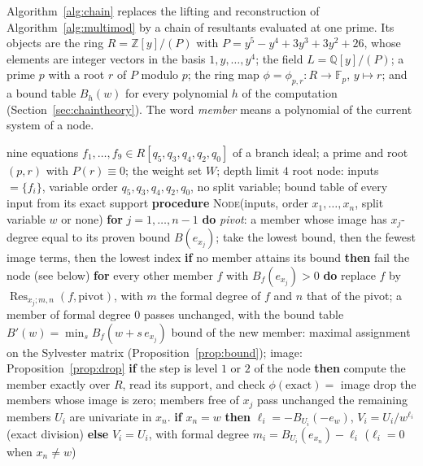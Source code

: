 \documentclass[11pt]{article}
\theoremstyle{remark}
\newcommand{\Q}{\mathbb{Q}}
\begin{document}
Algorithm~\ref{alg:chain} replaces the lifting and reconstruction of Algorithm~\ref{alg:multimod} by a chain of resultants evaluated at one prime. Its
objects are the ring $R=\mathbb Z[y]/(P)$ with $P=y^5-y^4+3y^3+3y^2+26$, whose elements are integer vectors in the basis $1,y,\dots,y^4$; the field
$L=\Q[y]/(P)$; a prime $p$ with a root $r$ of $P$ modulo $p$; the ring map $\phi=\phi_{p,r}\colon R\to\mathbb F_p$, $y\mapsto r$; and a bound table $B_h(w)$ for every
polynomial $h$ of the computation (Section~\ref{sec:chaintheory}). The word \emph{member} means a polynomial of the current system of a node.

\begin{algorithm}[t]
\caption{A7, the single-prime resultant-chain certificate tree for one branch ideal (EXP-146)}\label{alg:chain}
\begin{algorithmic}[1]
\Require nine equations $f_1,\dots,f_9\in R[q_5,q_3,q_4,q_2,q_0]$ of a branch ideal; a prime and root $(p,r)$ with $P(r)\equiv0$; the weight set $W$; depth limit $4$
\State root node: inputs $=\{f_i\}$, variable order $q_5,q_3,q_4,q_2,q_0$, no split variable; bound table of every input from its exact support
\State \textbf{procedure} \textsc{Node}(inputs, order $x_1,\dots,x_n$, split variable $w$ or none)
\State \quad \textbf{for} $j=1,\dots,n-1$ \textbf{do} 
\State \quad\quad \emph{pivot}: a member whose image has $x_j$-degree equal to its proven bound $B(e_{x_j})$; take the lowest bound, then the fewest image terms, then the lowest index
\State \quad\quad \textbf{if} no member attains its bound \textbf{then} fail the node (see below)
\State \quad\quad \textbf{for} every other member $f$ with $B_f(e_{x_j})>0$ \textbf{do} replace $f$ by $\operatorname{Res}_{x_j;m,n}(f,\text{pivot})$, with $m$ the formal degree of $f$ and $n$ that of the pivot; a member of formal degree $0$ passes unchanged, with the bound table $B'(w)=\min_s B_f(w+s\,e_{x_j})$
\State \quad\quad\quad bound of the new member: maximal assignment on the Sylvester matrix (Proposition~\ref{prop:bound}); image: Proposition~\ref{prop:drop}
\State \quad\quad\quad \textbf{if} the step is level $1$ or $2$ of the node \textbf{then} compute the member exactly over $R$, read its support, and check $\phi(\text{exact})=$ image
\State \quad\quad drop the members whose image is zero; members free of $x_j$ pass unchanged
\State \quad the remaining members $U_i$ are univariate in $x_n$. \textbf{if} $x_n=w$ \textbf{then} $\ell_i=-B_{U_i}(-e_w)$, $V_i=U_i/w^{\ell_i}$ (exact division) \textbf{else} $V_i=U_i$, with formal degree $m_i=B_{U_i}(e_{x_n})-\ell_i$ ($\ell_i=0$ when $x_n\ne w$)

\end{algorithmic}
\end{algorithm}
\end{document}
